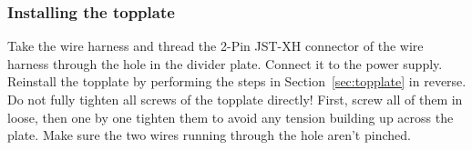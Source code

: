 \documentclass[]{article}
\begin{document}
\subsubsection{Installing the topplate}
\begin{minipage}[t]{0.5\linewidth}
	\vspace{0pt}
	Take the wire harness and thread the 2-Pin JST-XH connector of the wire harness through the hole in the divider plate. Connect it to the power supply. Reinstall the topplate by performing the steps in Section~\ref{sec:topplate} in reverse. Do not fully tighten all screws of the topplate directly! First, screw all of them in loose, then one by one tighten them to avoid any tension building up across the plate. Make sure the two wires running through the hole aren't pinched.
\end{minipage}
\hfill
\end{document}
